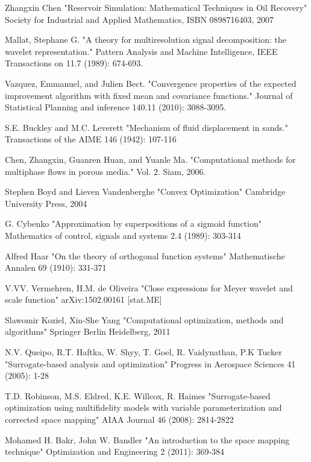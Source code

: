 \documentclass[a4paper,onecolumn]{article}
\theoremstyle{remark}
\begin{document}
\begin{thebibliography}{9}
Zhangxin Chen
"Reservoir Simulation: Mathematical Techniques in Oil Recovery"
Society for Industrial and Applied Mathematics, ISBN 0898716403, 2007

Mallat, Stephane G. 
"A theory for multiresolution signal decomposition: the wavelet representation." 
Pattern Analysis and Machine Intelligence, IEEE Transactions on 11.7 (1989): 674-693.

Vazquez, Emmanuel, and Julien Bect. 
"Convergence properties of the expected improvement algorithm with fixed mean and covariance functions." 
Journal of Statistical Planning and inference 140.11 (2010): 3088-3095.

S.E. Buckley and M.C. Leverett
"Mechanism of fluid displacement in sands."
Transactions of the AIME 146 (1942): 107-116

Chen, Zhangxin, Guanren Huan, and Yuanle Ma. 
"Computational methods for multiphase flows in porous media."
Vol. 2. Siam, 2006.

Stephen Boyd and Lieven Vandenberghe
"Convex Optimization"
Cambridge University Press, 2004

G. Cybenko
"Approximation by superpositions of a sigmoid function"
Mathematics of control, signals and systems 2.4 (1989): 303-314

Alfred Haar
"On the theory of orthogonal function systems"
Mathematische Annalen 69 (1910): 331-371

V.VV. Vermehren, H.M. de Oliveira
"Close expressions for Meyer wavelet and scale function"
arXiv:1502.00161 [stat.ME]

Slawomir Koziel, Xin-She Yang
"Computational optimization, methods and algorithms"
Springer Berlin Heidelberg, 2011

N.V. Queipo, R.T. Haftka, W. Shyy, T. Goel, R. Vaidynathan, P.K Tucker
"Surrogate-based analysis and optimization"
Progress in Aerospace Sciences 41 (2005): 1-28

T.D. Robinson, M.S. Eldred, K.E. Willcox, R. Haimes
"Surrogate-based optimization using multifidelity models with variable 
parameterization and corrected space mapping"
AIAA Journal 46 (2008): 2814-2822

Mohamed H. Bakr, John W. Bandler
"An introduction to the space mapping technique"
Optimization and Engineering 2 (2011): 369-384


\end{thebibliography}
\end{document}
